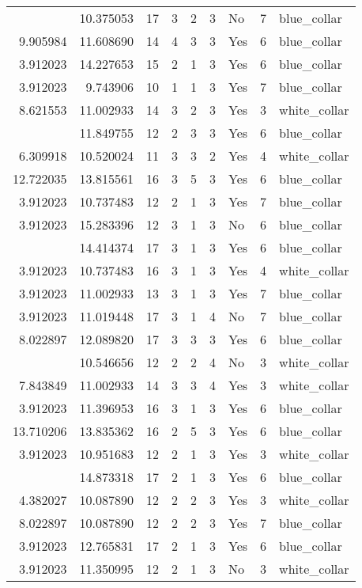 \documentclass[
]{article}
\begin{document}
\begin{longtable}[t]{rrrrrllrl}
\addlinespace
7.843849 & 10.375053 & 17 & 3 & 2 & 3 & No & 7 & blue\_collar\\
9.905984 & 11.608690 & 14 & 4 & 3 & 3 & Yes & 6 & blue\_collar\\
3.912023 & 14.227653 & 15 & 2 & 1 & 3 & Yes & 6 & blue\_collar\\
3.912023 & 9.743906 & 10 & 1 & 1 & 3 & Yes & 7 & blue\_collar\\
8.621553 & 11.002933 & 14 & 3 & 2 & 3 & Yes & 3 & white\_collar\\
\addlinespace
8.674197 & 11.849755 & 12 & 2 & 3 & 3 & Yes & 6 & blue\_collar\\
6.309918 & 10.520024 & 11 & 3 & 3 & 2 & Yes & 4 & white\_collar\\
12.722035 & 13.815561 & 16 & 3 & 5 & 3 & Yes & 6 & blue\_collar\\
3.912023 & 10.737483 & 12 & 2 & 1 & 3 & Yes & 7 & blue\_collar\\
3.912023 & 15.283396 & 12 & 3 & 1 & 3 & No & 6 & blue\_collar\\
\addlinespace
3.912023 & 14.414374 & 17 & 3 & 1 & 3 & Yes & 6 & blue\_collar\\
3.912023 & 10.737483 & 16 & 3 & 1 & 3 & Yes & 4 & white\_collar\\
3.912023 & 11.002933 & 13 & 3 & 1 & 3 & Yes & 7 & blue\_collar\\
3.912023 & 11.019448 & 17 & 3 & 1 & 4 & No & 7 & blue\_collar\\
8.022897 & 12.089820 & 17 & 3 & 3 & 3 & Yes & 6 & blue\_collar\\
\addlinespace
7.279319 & 10.546656 & 12 & 2 & 2 & 4 & No & 3 & white\_collar\\
7.843849 & 11.002933 & 14 & 3 & 3 & 4 & Yes & 3 & white\_collar\\
3.912023 & 11.396953 & 16 & 3 & 1 & 3 & Yes & 6 & blue\_collar\\
13.710206 & 13.835362 & 16 & 2 & 5 & 3 & Yes & 6 & blue\_collar\\
3.912023 & 10.951683 & 12 & 2 & 1 & 3 & Yes & 3 & white\_collar\\
\addlinespace
3.912023 & 14.873318 & 17 & 2 & 1 & 3 & Yes & 6 & blue\_collar\\
4.382027 & 10.087890 & 12 & 2 & 2 & 3 & Yes & 3 & white\_collar\\
8.022897 & 10.087890 & 12 & 2 & 2 & 3 & Yes & 7 & blue\_collar\\
3.912023 & 12.765831 & 17 & 2 & 1 & 3 & Yes & 6 & blue\_collar\\
3.912023 & 11.350995 & 12 & 2 & 1 & 3 & No & 3 & white\_collar\\

\end{longtable}
\end{document}
